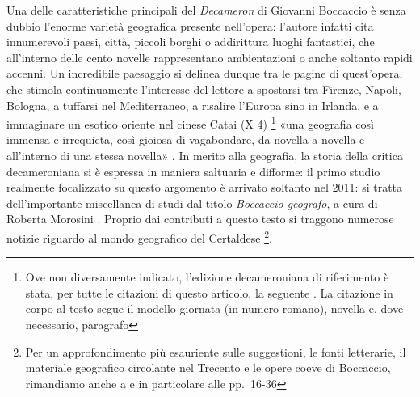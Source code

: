 Una delle caratteristiche principali del \emph{Decameron} di Giovanni
Boccaccio è senza dubbio l'enorme varietà geografica presente
nell'opera: l'autore infatti cita innumerevoli paesi, città, piccoli
borghi o addirittura luoghi fantastici, che all'interno delle cento
novelle rappresentano ambientazioni o anche soltanto rapidi accenni. Un
incredibile paesaggio si delinea dunque tra le pagine di quest'opera,
che stimola continuamente l'interesse del lettore a spostarsi tra
Firenze, Napoli, Bologna, a tuffarsi nel Mediterraneo, a risalire
l'Europa sino in Irlanda, e a immaginare un esotico oriente nel cinese
Catai (X 4) \footnote{Ove non diversamente indicato, l'edizione
  decameroniana di riferimento è stata, per tutte le citazioni di questo
  articolo, la seguente \autocite{boccaccio2013decameron}. La citazione
  in corpo al testo segue il modello giornata (in numero romano),
  novella e, dove necessario, paragrafo} «una geografia così immensa e
irrequieta, così gioiosa di vagabondare, da novella a novella e
all'interno di una stessa novella» \autocite{getto1972vita}. In merito
alla geografia, la storia della critica decameroniana si è espressa in
maniera saltuaria e difforme: il primo studio realmente focalizzato su
questo argomento è arrivato soltanto nel 2011: si tratta dell'importante
miscellanea di studi dal titolo \emph{Boccaccio geografo}, a cura di
Roberta Morosini \autocite{morosini2010boccaccio}. Proprio dai
contributi a questo testo si traggono numerose notizie riguardo al mondo
geografico del Certaldese \footnote{Per un approfondimento più
  esauriente sulle suggestioni, le fonti letterarie, il materiale
  geografico circolante nel Trecento e le opere coeve di Boccaccio,
  rimandiamo anche a \autocite{bolpagni2016} e in particolare alle
  pp.~16-36}.

